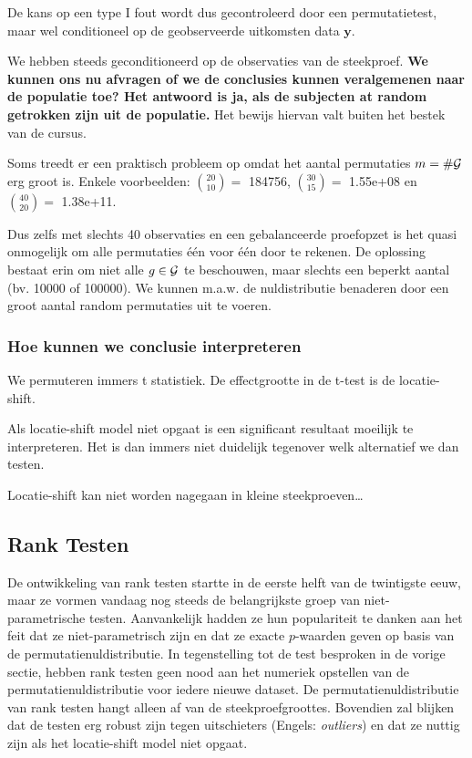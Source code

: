\documentclass[
  12pt,dutch,coursenotes]{book}
\theoremstyle{definition}
\theoremstyle{definition}
\theoremstyle{definition}
\theoremstyle{remark}
\begin{document}
De kans op een type I fout wordt dus gecontroleerd door een permutatietest, maar wel conditioneel op de geobserveerde uitkomsten data \(\mathbf{y}\).

We hebben steeds geconditioneerd op de observaties van de steekproef. \textbf{We kunnen ons nu afvragen of we de conclusies kunnen veralgemenen naar de populatie toe? Het antwoord is ja, als de subjecten at random getrokken zijn uit de populatie.} Het bewijs hiervan valt buiten het bestek van de cursus.

Soms treedt er een praktisch probleem op omdat het aantal permutaties \(m=\#{\cal{G}}\) erg groot is. Enkele voorbeelden:
\(\binom{20}{10}=\) 184756, \(\binom{30}{15}=\) 1.55e+08 en \(\binom{40}{20}=\) 1.38e+11.

Dus zelfs met slechts 40 observaties en een gebalanceerde proefopzet is het quasi onmogelijk om alle permutaties één voor één door te rekenen.
De oplossing bestaat erin om niet alle \(g \in {\cal{G}}\) te beschouwen, maar slechts een beperkt aantal (bv. 10000 of 100000).
We kunnen m.a.w. de nuldistributie benaderen door een groot aantal random permutaties uit te voeren.

\hypertarget{hoe-kunnen-we-conclusie-interpreteren}{%
\subsubsection{Hoe kunnen we conclusie interpreteren}\label{hoe-kunnen-we-conclusie-interpreteren}}

We permuteren immers t statistiek. De effectgrootte in de t-test is de locatie-shift.

Als locatie-shift model niet opgaat is een significant resultaat moeilijk te interpreteren. Het is dan immers niet duidelijk tegenover welk alternatief we dan testen.

Locatie-shift kan niet worden nagegaan in kleine steekproeven\ldots{}

\hypertarget{rank-testen}{%
\subsection{Rank Testen}\label{rank-testen}}

De ontwikkeling van rank testen startte in de eerste helft van de twintigste eeuw, maar ze vormen vandaag nog steeds de belangrijkste groep van niet-parametrische testen. Aanvankelijk hadden ze hun populariteit te danken aan het feit dat ze niet-parametrisch zijn en dat ze exacte \(p\)-waarden geven op basis van de permutatienuldistributie. In tegenstelling tot de test besproken in de vorige sectie, hebben rank testen geen nood aan het numeriek opstellen van de permutatienuldistributie voor iedere nieuwe dataset. De permutatienuldistributie van rank testen hangt alleen af van de steekproefgroottes. Bovendien zal blijken dat de testen erg robust zijn tegen uitschieters (Engels: \emph{outliers}) en dat ze nuttig zijn als het locatie-shift model niet opgaat.
\end{document}
